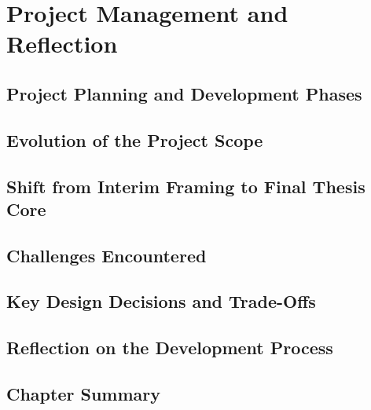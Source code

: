\chapter{Project Management and Reflection}
\section{Project Planning and Development Phases}
\section{Evolution of the Project Scope}
\section{Shift from Interim Framing to Final Thesis Core}
\section{Challenges Encountered}
\section{Key Design Decisions and Trade-Offs}
\section{Reflection on the Development Process}
\section{Chapter Summary}
